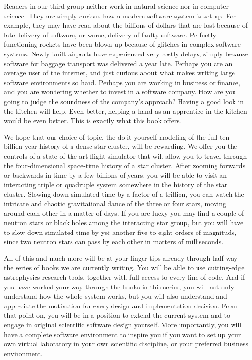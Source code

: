 Readers in our third group neither work in natural science nor in
computer science.  They are simply curious how a modern software
system is set up.  For example, they may have read about the billions
of dollars that are lost because of late delivery of software, or
worse, delivery of faulty software.  Perfectly functioning rockets
have been blown up because of glitches in complex software systems.
Newly built airports have experienced very costly delays, simply
because software for baggage transport was delivered a year late.
Perhaps you are an average user of the internet, and just curious
about what makes writing large software environments so hard.  Perhaps
you are working in business or finance, and you are wondering whether
to invest in a software company.  How are you going to judge the
soundness of the company's approach?  Having a good look in the
kitchen will help.  Even better, helping a hand as an apprentice in
the kitchen would be even better.  This is exactly what this book offers.

We hope that our choice of topic, the do-it-yourself modeling of the
full ten-billion-year history of a dense star cluster, will be
rewarding.  We offer you the controls of a state-of-the-art flight
simulator that will allow you to travel through the four-dimensional
space-time history of a star cluster.  After zooming forwards or
backwards in time by a few billions of years, you will be able to
visit an interacting triple or quadruple system somewhere in the
history of the star cluster.  Slowing down simulated time by a factor
of a trillion, you can watch the intricate and chaotic gravitational
dance of the three or four stars, moving around each other in a matter
of days.  If you are lucky you may find a couple of neutron stars or
black holes among the interacting star group, but you will have to
slow down simulated time by yet another five to eight orders of
magnitude, since two neutron stars can pass by each other in matters
of milliseconds.

All of this and much more will be at your finger tips already through
half-way the series of books we are currently writing.  You will be
able to use cutting-edge astrophysics research tools, together with
full access to every line of code.  And if you have worked your way
through the books in this series, you will not only understand how the
whole system works, but you will also understand and appreciate the
motivation for every design and implementation decision.  From that
point on, you will be in a position to extend the current system and
to engage in original scientific software design yourself.  More
importantly, you will have a complete software environment to inspire
you if you want to set up your own virtual laboratory in your own
scientific discipline, or your preferred business environment.

